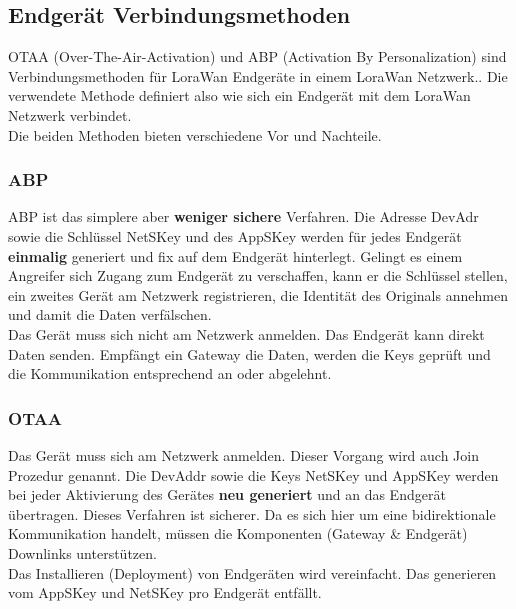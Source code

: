 \documentclass[11pt,english,german]{report}
\theoremstyle{definition}
\begin{document}
\newpage
\subsection{Endgerät Verbindungsmethoden}
OTAA (Over-The-Air-Activation) und ABP (Activation By Personalization) sind Verbindungsmethoden für LoraWan Endgeräte in einem LoraWan Netzwerk.\cite{jaguar}. Die verwendete Methode definiert also wie sich ein Endgerät mit dem LoraWan Netzwerk verbindet. \\[0.3cm]
Die beiden Methoden bieten verschiedene Vor und Nachteile.

\subsubsection{ABP}
ABP ist das simplere aber \textbf{weniger sichere} Verfahren. Die Adresse DevAdr sowie die Schlüssel NetSKey und des AppSKey werden für jedes Endgerät \textbf{einmalig} generiert und fix auf dem Endgerät hinterlegt. Gelingt es einem Angreifer sich Zugang zum Endgerät zu verschaffen, kann er die Schlüssel stellen, ein zweites Gerät am Netzwerk registrieren, die Identität des Originals annehmen und damit die Daten verfälschen.\\[0.3cm]
Das Gerät muss sich nicht am Netzwerk anmelden. Das Endgerät kann direkt Daten senden. Empfängt ein Gateway die Daten, werden die Keys geprüft und die Kommunikation entsprechend an oder abgelehnt.

\subsubsection{OTAA}
Das Gerät muss sich am Netzwerk anmelden. Dieser Vorgang wird auch Join Prozedur genannt. Die DevAddr sowie die Keys NetSKey und AppSKey werden bei jeder Aktivierung des Gerätes \textbf{neu generiert} und an das Endgerät übertragen. Dieses Verfahren ist sicherer. Da es sich hier um eine bidirektionale Kommunikation handelt, müssen die Komponenten (Gateway \& Endgerät) Downlinks unterstützen.\\[0.3cm]
Das Installieren (Deployment) von Endgeräten wird vereinfacht. Das generieren vom AppSKey und NetSKey pro Endgerät entfällt. 
\end{document}
